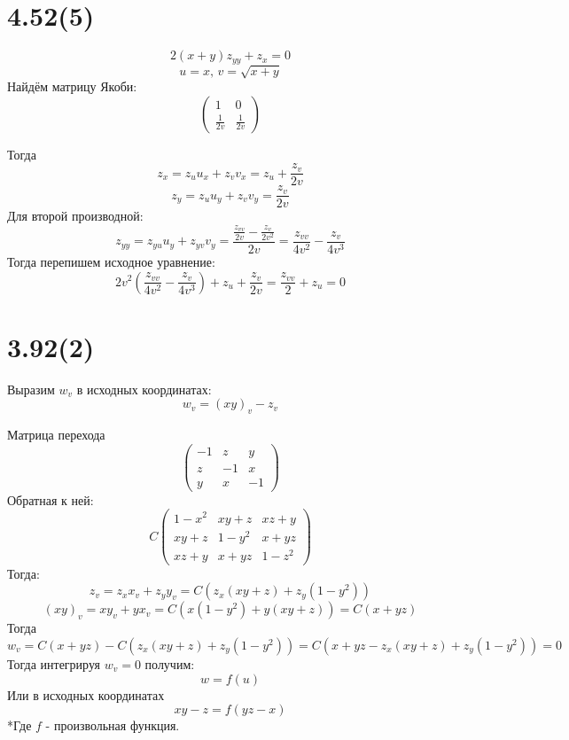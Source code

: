 \documentclass[12pt]{article}
\begin{document}
\section*{4.52(5)}
\[
    2(x + y) z_{yy} + z_x = 0
\]
\[
    u = x, \, v = \sqrt{x + y} 
\]
Найдём матрицу Якоби: 
\[
    \begin{pmatrix}
        1 & 0 \\
        \frac{1}{2v} & \frac{1}{2v}
    \end{pmatrix}
\]

Тогда 
\[
    z_x = z_u u_x + z_v v_x = 
    z_u + \frac{z_{v}}{2v}
\] 
\[
    z_y = z_u u_y + z_v v_y = 
    \frac{z_v}{2v}   
\] 
Для второй производной: 
\[
    z_{yy} = z_{yu} u_y + z_{yv} v_y = 
    \frac{ \frac{z_{vv}}{2v} - \frac{z_v}{2v^2}}{2v} = 
    \frac{z_{vv}}{4v^2} - \frac{z_v}{4v^3}
\]
Тогда перепишем исходное уравнение:
\[
    2v^{2} \left( \frac{z_{vv}}{4v^2} - \frac{z_v}{4v^3} \right) + z_u + \frac{z_{v}}{2v} = 
    \frac{z_{vv}}{2} + z_u = 0
\]
\section*{3.92(2)}
Выразим $w_v$ в исходных координатах: 
\[
    w_v = (xy)_v - z_v 
\]

Матрица перехода 
\[
    \begin{pmatrix}
        -1 & z & y \\
        z & -1 & x \\
        y & x & -1
    \end{pmatrix}
\]
Обратная к ней: 
\[
    C
    \begin{pmatrix}
        1 - x^2 & xy + z & xz + y \\
        xy + z & 1 - y^2 & x + yz \\
        xz + y & x + yz & 1 - z^2
    \end{pmatrix}
\]
Тогда: 
\[
    z_v = z_x x_v + z_y y_v = C (z_x (xy + z) + z_y (1 - y^2)) 
\]
\[
    (xy)_v = x y_v + y x_v = C(x(1 - y^2) + y(xy + z)) = 
    C(x + yz)
\]
Тогда 
\[
    w_v = C(x + yz) - C(z_x (xy + z) + z_y (1 - y^2)) = 
    C(x + yz - z_x (xy + z) + z_y (1 - y^2)) = 0
\]
Тогда интегрируя $w_v = 0$ получим: 
\[
    w = f(u)
\] 
Или в исходных координатах 
\[
    xy - z = f(yz - x)
\]
*Где $f$ - произвольная функция. 
\end{document}
